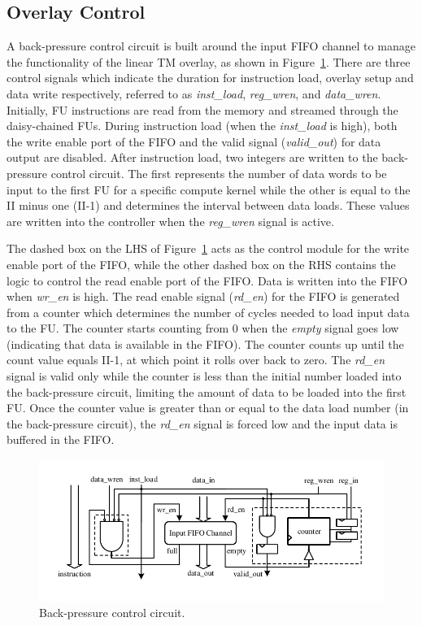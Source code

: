 \subsection{Overlay Control}
A back-pressure control circuit is built around the input FIFO channel to manage the functionality of the linear TM overlay, as shown in Figure~\ref{back_pressure}. 
There are three control signals which indicate the duration for instruction load, overlay setup and data write respectively, referred to as \textit{inst\_load}, \textit{reg\_wren}, and \textit{data\_wren}. 
Initially, FU instructions are read from the memory and streamed through the daisy-chained FUs. 
During instruction load (when the \textit{inst\_load} is high), both the write enable port of the FIFO and the valid signal (\textit{valid\_out}) for data output are disabled. 
After instruction load, two integers are written to the back-pressure control circuit. 
The first represents the number of data words to be input to the first FU for a specific compute kernel while the other is equal to the II minus one (II-1) and determines the interval between data loads. 
These values are written into the controller when the \textit{reg\_wren} signal is active.

The dashed box on the LHS of Figure~\ref{back_pressure} acts as the control module for the write enable port of the FIFO, while the other dashed box on the RHS contains the logic to control the read enable port of the FIFO. 
Data is written into the FIFO when \textit{wr\_en} is high.
The read enable signal (\textit{rd\_en}) for the FIFO is generated from a counter which determines the number of cycles needed to load input data to the FU. 
The counter starts counting from 0 when the \textit{empty} signal goes low (indicating that data is available in the FIFO). The counter counts up until the count value equals II-1, at which point it rolls over back to zero.   
The \textit{rd\_en} signal is valid only while the counter is less than the initial number loaded into the back-pressure circuit, limiting the amount of data to be loaded into the first FU.
Once the counter value is greater than or equal to the data load number (in the back-pressure circuit), the \textit{rd\_en} signal is forced low and the input data is buffered in the FIFO.


\begin{figure}
	\centering
	\includegraphics[width=\columnwidth]{Figures/control.pdf}
	\caption{Back-pressure control circuit.}
	\label{back_pressure}
\end{figure}
	

